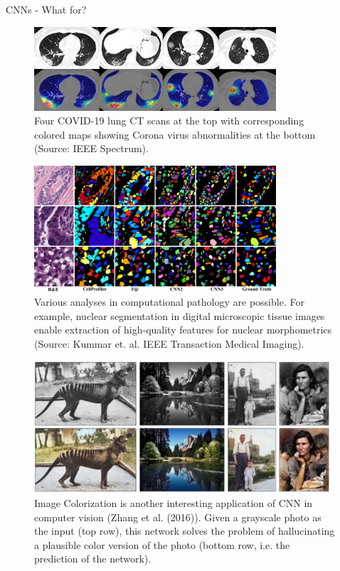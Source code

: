 \begin{vbframe}{CNNs - What for?}
   \begin{figure}
    \centering
    \includegraphics[width=9cm]{figure/hitmap.jpeg}
    \caption{Four COVID-19 lung CT scans at the top with corresponding colored maps showing Corona virus abnormalities at the bottom (Source: IEEE Spectrum).}
  \end{figure}
\framebreak

  \begin{figure}
    \centering
    \includegraphics[width=9cm]{figure/instanceseg.png}
    \caption{Various analyses in computational pathology are possible. For example, nuclear segmentation in digital microscopic tissue images enable extraction of high-quality features for nuclear morphometrics (Source: Kummar et. al. IEEE Transaction Medical Imaging). }
  \end{figure}
\framebreak

  \begin{figure}
    \centering
    \includegraphics[width=11cm]{figure/colorization.png}
    \caption{Image Colorization is another interesting application of CNN in computer vision (Zhang et al. (2016)). Given a grayscale photo as the input (top row), this network solves the problem of hallucinating a plausible color version of the photo (bottom row, i.e. the prediction of the network).}
  \end{figure}
\framebreak


\end{vbframe}
